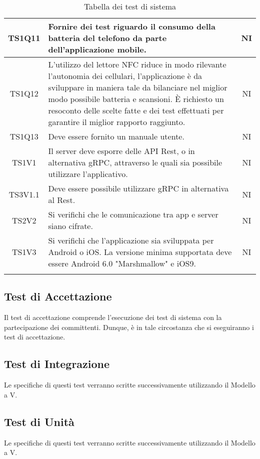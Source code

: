 \begin{center}
\begin{longtable}{|c|p{10cm}|c|}
			\hline
			TS1Q11 & Fornire dei test riguardo il consumo della batteria del telefono da parte dell'applicazione mobile. & NI \\	
			\hline
			TS1Q12 & L’utilizzo del lettore NFC riduce in modo rilevante l’autonomia dei cellulari, l’applicazione è da sviluppare in maniera tale da bilanciare nel miglior modo possibile batteria e scansioni. È richiesto un resoconto delle scelte fatte e dei test effettuati per garantire il miglior rapporto raggiunto. & NI \\	
			\hline
			TS1Q13 & Deve essere fornito un manuale utente. & NI \\	
			\hline
			TS1V1 & Il server deve esporre delle API Rest, o in alternativa gRPC, attraverso le quali sia possibile utilizzare l'applicativo. & NI \\	
			\hline
			TS3V1.1 & Deve essere possibile utilizzare gRPC in alternativa al Rest. & NI \\	
			\hline
			TS2V2 & Si verifichi che le comunicazione tra app e server siano cifrate. & NI \\	
			\hline
			TS1V3 & Si verifichi che l'applicazione sia sviluppata per Android o iOS. La versione minima supportata deve essere  Android 6.0 "Marshmallow" e iOS9. & NI \\	
			\hline
			\hiderowcolors
			\caption{Tabella dei test di sistema}		
		\end{longtable}	
	\end{center}

	\subsection{Test di Accettazione}
	Il test di accettazione comprende l'esecuzione dei test di sistema con la partecipazione dei committenti. Dunque, è in tale circostanza che si eseguiranno i test di accettazione. 
	\subsection{Test di Integrazione}
	Le specifiche di questi test verranno scritte successivamente utilizzando il Modello a V.
	\subsection{Test di Unità}
	Le specifiche di questi test verranno scritte successivamente utilizzando il Modello a V.
